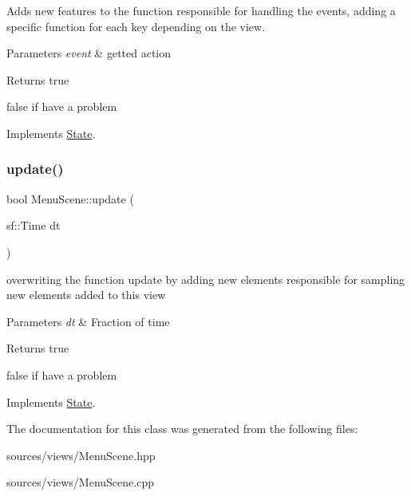 Adds new features to the function responsible for handling the events, adding a specific function for each key depending on the view. 


\begin{DoxyParams}{Parameters}
{\em event} & getted action \\
\hline
\end{DoxyParams}
\begin{DoxyReturn}{Returns}
true 

false if have a problem 
\end{DoxyReturn}


Implements \hyperlink{classState_a19965f83460b248c42952aac8d001206}{State}.

\mbox{\label{classMenuScene_ab18847a026d82d5ffe8c869bbf78725e}} 
\subsubsection{\texorpdfstring{update()}{update()}}
{\footnotesize\ttfamily bool Menu\+Scene\+::update (\begin{DoxyParamCaption}\item[{sf\+::\+Time}]{dt }\end{DoxyParamCaption})\hspace{0.3cm}{\ttfamily [virtual]}}



overwriting the function update by adding new elements responsible for sampling new elements added to this view 


\begin{DoxyParams}{Parameters}
{\em dt} & Fraction of time \\
\hline
\end{DoxyParams}
\begin{DoxyReturn}{Returns}
true 

false if have a problem 
\end{DoxyReturn}


Implements \hyperlink{classState_acd5926bc7a373edff9e57f3ffe94ca13}{State}.



The documentation for this class was generated from the following files\+:\begin{DoxyCompactItemize}
\item 
sources/views/Menu\+Scene.\+hpp\item 
sources/views/Menu\+Scene.\+cpp\end{DoxyCompactItemize}
